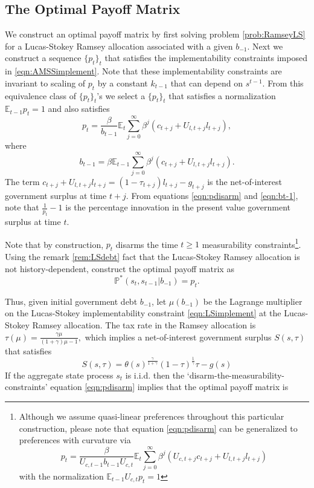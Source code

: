 \documentclass[12pt]{article}
\newcommand{\EE}{\mathbb E}
\begin{document}
\subsection{The Optimal Payoff Matrix\label{sec:David41}} We construct an  optimal payoff matrix by first solving  problem \ref{prob:RamseyLS} for a Lucas-Stokey Ramsey allocation associated with a given $b_{-1}$. Next we construct a sequence $\{p_t\}_t$ that satisfies the implementability constraints imposed in \eqref{eqn:AMSSimplement}.  Note that these implementability constraints are invariant to scaling of $p_t$ by a constant $k_{t-1} $ that can depend on $s^{t-1}$. From this equivalence class of $\{p_t\}_t$'s we select a  $\{p_t\}_t$ that satisfies a normalization  %
$\mathbb{E}_{t-1}p_t=1$ and also satisfies
\begin{equation}\label{eqn:pdisarm}
p_t =  \frac{\beta}{b_{t-1}}\EE_t\sum_{j=0}^\infty\beta^j\left( c_{t+j}+U_{l,t+j}l_{t+j}\right),
\end{equation} where
\begin{equation}\label{eqn:bt-1}
	b_{t-1} = \beta \EE_{t-1}\sum_{j=0}^\infty \beta^j(c_{t+j}+U_{l,t+j}l_{t+j}).
\end{equation}  The term $c_{t+j} +U_{l,t+j}l_{t+j}=(1-\tau_{t+j})l_{t+j} - g_{t+j}$  is the net-of-interest government surplus at time $t+j$.  From equations \eqref{eqn:pdisarm} and \eqref{eqn:bt-1}, note that  $\frac{1}{p_t}-1$ is  the percentage innovation in the present value government surplus at time $t$.


Note that by construction, $p_t$   disarms the time  $t\geq 1$
measurability constraints\footnote{Although we assume  quasi-linear preferences throughout  this particular construction, please note that equation \eqref{eqn:pdisarm} can be generalized to preferences with curvature via
\[
p_t =  \frac{\beta}{U_{c,t-1}b_{t-1}U_{c,t}}\EE_t\sum_{j=0}^\infty\beta^j\left( U_{c,t+j}c_{t+j}+U_{l,t+j}l_{t+j}\right) \]
with the normalization $\EE_{t-1}U_{c,t}p_t = 1$}.  Using the remark \ref{rem:LSdebt} fact that the Lucas-Stokey Ramsey allocation is not history-dependent,  construct the optimal payoff matrix as
\[\mathbb{P}^*(s_t,s_{t-1}|b_{-1})=p_t.\]

Thus,  given
 initial government debt $b_{-1}$,  let $\mu(b_{-1})$ be the Lagrange multiplier on the Lucas-Stokey implementability constraint \eqref{eqn:LSimplement}
 at the Lucas-Stokey Ramsey allocation.   The tax rate in the Ramsey allocation is
$
		\tau(\mu) = \frac{\gamma\mu}{(1+\gamma)\mu-1},
	$
 which implies a  net-of-interest government surplus $S(s,\tau)$ that satisfies
\[		S(s,\tau) = \theta(s)^\frac\gamma{1+\gamma}(1-\tau)^\frac1\gamma\tau-g(s)
	\]
If the aggregate state process $s_t$ is i.i.d. then the `disarm-the-measurability-constraints' equation \eqref{eqn:pdisarm} implies that the optimal payoff matrix is
\end{document}
